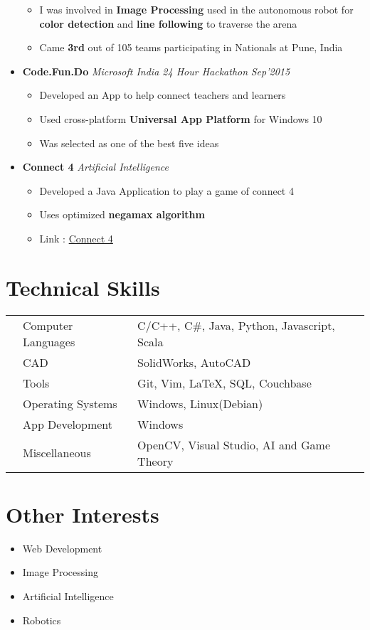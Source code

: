 \documentclass[11pt,a4paper]{moderncv}
\newcommand{\experience}[3]{
  \item \textbf{\large{#1}} \hfill \emph{#3} \hfill \textit{#2}
}
\begin{document}
\begin{itemize}
\begin{itemize}
        \item I was involved in \textbf{Image Processing} used in the autonomous robot for \textbf{color detection} and \textbf{line following} to traverse the arena
        \item Came \textbf{3rd} out of 105 teams participating in Nationals at Pune, India
      \end{itemize}
      \experience{Code.Fun.Do}{Sep'2015}{Microsoft India 24 Hour Hackathon}
      \begin{itemize}
        \item Developed an App to help connect teachers and learners
        \item Used cross-platform \textbf{Universal App Platform} for Windows 10
        \item Was selected as one of the best five ideas
      \end{itemize}
      \experience{Connect 4}{}{Artificial Intelligence}
      \begin{itemize}
        \item Developed a Java Application to play a game of connect 4
        \item Uses optimized \textbf{negamax algorithm}
        \item Link : \href{http://github.com/yashsriv/Connect-4}{Connect 4}
      \end{itemize}
    \end{itemize}
  \section{Technical Skills}
  \begin{tabular}{L{0.05cm} L{6cm} l}
      & Computer Languages   & C/C++, C\#, Java, Python, Javascript, Scala\\
      & CAD                  & SolidWorks, AutoCAD \\
      & Tools                & Git, Vim, \LaTeX, SQL, Couchbase \\
      & Operating Systems    & Windows, Linux(Debian)\\
      & App Development      & Windows \\
      & Miscellaneous        & OpenCV, Visual Studio, AI and Game Theory
    \end{tabular}
  \section{Other Interests}
    \begin {itemize}
      \item Web Development
      \item Image Processing
      \item Artificial Intelligence
      \item Robotics
    \end{itemize}
\end{document}
